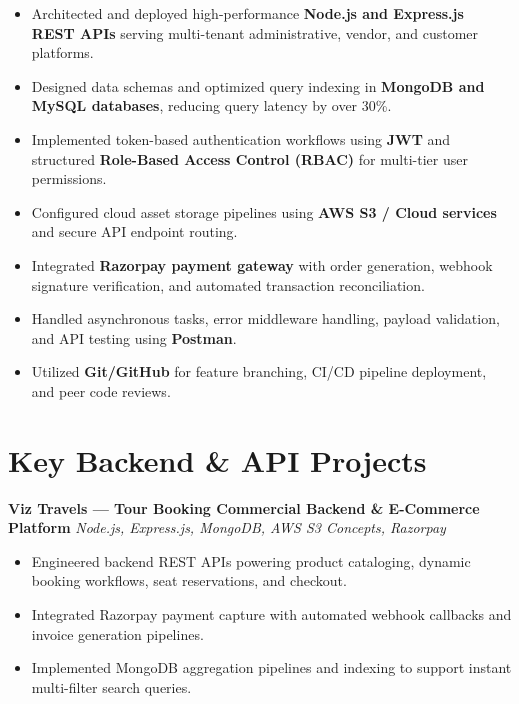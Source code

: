 \documentclass[a4paper,10pt]{article}
\begin{document}
\begin{itemize}

    \item Architected and deployed high-performance \textbf{Node.js and Express.js REST APIs} serving multi-tenant administrative, vendor, and customer platforms.

    \item Designed data schemas and optimized query indexing in \textbf{MongoDB and MySQL databases}, reducing query latency by over 30\%.

    \item Implemented token-based authentication workflows using \textbf{JWT} and structured \textbf{Role-Based Access Control (RBAC)} for multi-tier user permissions.

    \item Configured cloud asset storage pipelines using \textbf{AWS S3 / Cloud services} and secure API endpoint routing.

    \item Integrated \textbf{Razorpay payment gateway} with order generation, webhook signature verification, and automated transaction reconciliation.

    \item Handled asynchronous tasks, error middleware handling, payload validation, and API testing using \textbf{Postman}.

    \item Utilized \textbf{Git/GitHub} for feature branching, CI/CD pipeline deployment, and peer code reviews.

\end{itemize}

\section*{Key Backend \& API Projects}

\textbf{Viz Travels --- Tour Booking Commercial Backend \& E-Commerce Platform}
\hfill
\textit{Node.js, Express.js, MongoDB, AWS S3 Concepts, Razorpay}

\begin{itemize}

    \item Engineered backend REST APIs powering product cataloging, dynamic booking workflows, seat reservations, and checkout.

    \item Integrated Razorpay payment capture with automated webhook callbacks and invoice generation pipelines.

    \item Implemented MongoDB aggregation pipelines and indexing to support instant multi-filter search queries.

\end{itemize}
\end{document}
